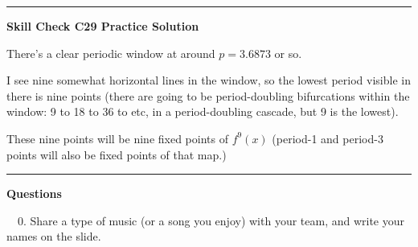 \documentclass[12pt,letterpaper,noanswers]{exam}
\begin{document}
\vspace{0.2cm}

\hrule
\vspace{0.2cm}

\noindent\textbf{Skill Check C29 Practice Solution}


There's a clear periodic window at around $p = 3.6873$ or so.

I see nine somewhat horizontal lines in the window, so the lowest period visible in there is nine points (there are going to be period-doubling bifurcations within the window: 9 to 18 to 36 to etc, in a period-doubling cascade, but 9 is the lowest).

These nine points will be nine fixed points of $f^9(x)$ (period-1 and period-3 points will also be fixed points of that map.)

\vspace{0.2cm}

\hrule
\vspace{0.2cm}


\noindent\textbf{Questions}

\noindent \ \ 0.  Share a type of music (or a song you enjoy) with your team, and write your names on the slide.
\end{document}
